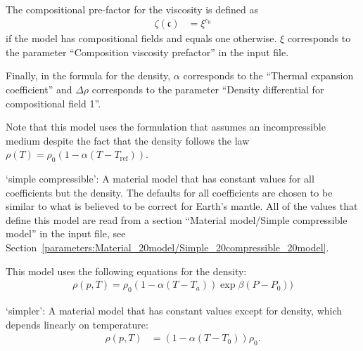\begin{itemize}
The compositional pre-factor for the viscosity is defined as \begin{align}  \zeta(\mathfrak c) &= \xi^{c_0}\end{align} if the model has compositional fields and equals one otherwise. $\xi$ corresponds to the parameter ``Composition viscosity prefactor'' in the input file.

Finally, in the formula for the density, $\alpha$ corresponds to the ``Thermal expansion coefficient'' and $\Delta\rho$ corresponds to the parameter ``Density differential for compositional field 1''.

Note that this model uses the formulation that assumes an incompressible medium despite the fact that the density follows the law $\rho(T)=\rho_0(1-\alpha(T-T_{\text{ref}}))$. 


`simple compressible': A material model that has constant values for all coefficients but the density. The defaults for all coefficients are chosen to be similar to what is believed to be correct for Earth's mantle. All of the values that define this model are read from a section ``Material model/Simple compressible model'' in the input file, see Section~\ref{parameters:Material_20model/Simple_20compressible_20model}.

This model uses the following equations for the density: \begin{align}  \rho(p,T) = \rho_0              \left(1-\alpha (T-T_a)\right)               \exp{\beta (P-P_0))}\end{align}

`simpler': A material model that has constant values except for density, which depends linearly on temperature: \begin{align}  \rho(p,T) &= \left(1-\alpha (T-T_0)\right)\rho_0.\end{align}



\end{itemize}
